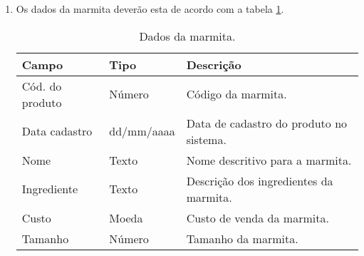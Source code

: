 \begin{enumerate}[label=ED\arabic*]
	\item Os dados da marmita deverão esta de acordo com a tabela \ref{uc017_tb_rn1}. \label{uc017_ed:1}
	\begin{table}[htb]
		\ABNTEXfontereduzida
		\caption[Dados da marmita]{Dados da marmita.}
		\label{uc017_tb_rn1}
		\begin{tabular}{|p{4.0cm}|p{3.0cm}|p{7.25cm}|}
			\hline
			\textbf{Campo}  & \textbf{Tipo} & \textbf{Descrição}                      \\ \hline
			Cód. do produto & Número        & Código da marmita.                      \\ \hline
			Data cadastro   & dd/mm/aaaa    & Data de cadastro do produto no sistema. \\ \hline
			Nome            & Texto         & Nome descritivo para a marmita.         \\ \hline
			Ingrediente     & Texto         & Descrição dos ingredientes da marmita.  \\ \hline
			Custo           & Moeda         & Custo de venda da marmita.              \\ \hline
			Tamanho         & Número        & Tamanho da marmita.                     \\ \hline
		\end{tabular}
	\end{table}
\end{enumerate}